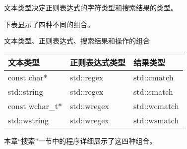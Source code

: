 文本类型决定正则表达式的字符类型和搜索结果的类型。

下表显示了四种不同的组合。

\begin{center}
文本类型、正则表达式、搜索结果和操作的组合
\end{center}

\begin{longtable}[c]{|l|l|l|}
\hline
\textbf{文本类型} & \textbf{正则表达式类型} & \textbf{结果类型} \\ \hline
\endfirsthead
%
\endhead
%
const char*        & std::regex                       & std::cmatch          \\ \hline
std::string        & std::regex                       & std::smatch          \\ \hline
const wchar\_t*    & std::wregex                      & std::wcmatch         \\ \hline
std::wstring       & std::wregex                      & std::wsmatch         \\ \hline
\end{longtable}


本章“搜索”一节中的程序详细展示了这四种组合。

















